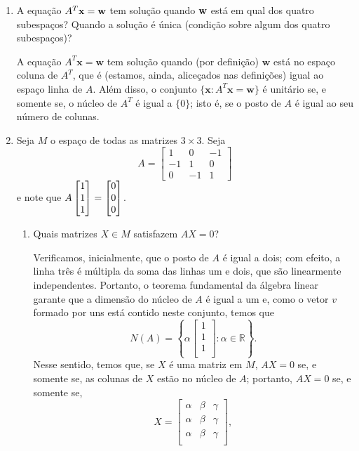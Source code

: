\documentclass[leqno]{article}
\begin{document}
\begin{enumerate}
\item A equação $A^T \mathbf{x} = \mathbf{w}$ tem solução quando $\mathbf{w}$ está em qual dos quatro subespaços? Quando a solução é única (condição sobre algum dos quatro subespaços)?

\begin{sol} 
	A equação $A^{T} \mathbf{x} = \mathbf{w}$ tem solução quando (por definição) $\mathbf{w}$ está no espaço coluna de $A^{T}$, que é (estamos, ainda, aliceçados nas definições) igual ao espaço linha de $A$. Além disso, o conjunto $\{\mathbf{x} : A^{T}\mathbf{x} = \mathbf{w}\}$ é unitário se, e somente se, o núcleo de $A^{T}$ é igual a $\{0\}$; isto é, se o posto de $A$ é igual ao seu número de colunas.   
\end{sol} 

\item Seja $M$ o espaço de todas as matrizes $3 \times 3$. Seja
$$A = \begin{bmatrix}
1 & 0 & -1 \\
-1 & 1 & 0 \\
0 & -1 & 1
\end{bmatrix}$$
e note que $A \begin{bmatrix} 1 \\ 1 \\ 1 \end{bmatrix} = \begin{bmatrix} 0 \\ 0 \\ 0 \end{bmatrix}$.

\begin{enumerate}

\item Quais matrizes $X \in M$ satisfazem $AX = 0$?

	\begin{sol} 
		Verificamos, inicialmente, que o posto de $A$ é igual a dois; com efeito, a linha três é múltipla da soma das linhas um e dois, que são linearmente independentes. Portanto, o teorema fundamental da álgebra linear garante que a dimensão do núcleo de $A$ é igual a um e, como o vetor $v$ formado por uns está contido neste conjunto, temos que 
		\begin{equation*} 
			N(A) = 
			\left\{ \alpha 
				\begin{bmatrix} 
					1 \\ 
					1 \\ 
					1 \\ 
				\end{bmatrix} : 
				\alpha \in \mathbb{R} 
			\right\}. 
		\end{equation*} 
		\noindent Nesse sentido, temos que, se $X$ é uma matriz em $M$, $AX = 0$ se, e somente se, as colunas de $X$ estão no núcleo de $A$; portanto, $AX = 0$ se, e somente se, 
		\begin{equation*} 
			X = 
			\begin{bmatrix} 
				\alpha & \beta & \gamma \\ 
				\alpha & \beta & \gamma \\ 
				\alpha & \beta & \gamma \\ 
			\end{bmatrix}, 
		\end{equation*} 


\end{sol}
\end{enumerate}
\end{enumerate}
\end{document}
